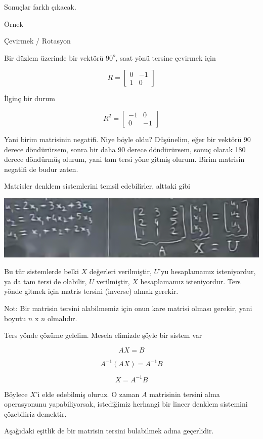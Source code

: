 \documentclass[12pt,fleqn]{article}\usepackage{../../common}
\begin{document}
Sonuçlar farklı çıkacak.

Örnek

Çevirmek / Rotasyon

Bir düzlem üzerinde bir vektörü $90^o$, saat yönü tersine
çevirmek için

$$ R =
\left[\begin{array}{rr}
0 & -1 \\
1 & 0
\end{array}\right]
$$

İlginç bir durum

$$ R^2 =
\left[\begin{array}{rr}
-1 & 0 \\
0 & -1
\end{array}\right]
$$

Yani birim matrisinin negatifi. Niye böyle oldu? Düşünelim, eğer bir vektörü 90
derece döndürürsem, sonra bir daha 90 derece döndürürsem, sonuç olarak 180
derece döndürmüş olurum, yani tam tersi yöne gitmiş olurum. Birim matrisin
negatifi de budur zaten.

Matrisler denklem sistemlerini temsil edebilirler, alttaki gibi

\includegraphics[width=14.9cm]{3_5.png}

Bu tür sistemlerde belki $X$ değerleri verilmiştir, $U$'yu hesaplamamız
isteniyordur, ya da tam tersi de olabilir, $U$ verilmiştir, $X$ hesaplamamız
isteniyordur. Ters yönde gitmek için matris tersini (inverse) almak gerekir.

Not: Bir matrisin tersini alabilmemiz için onun kare matrisi olması gerekir,
yani boyutu $n$ x $n$ olmalıdır.

Ters yönde çözüme gelelim. Mesela elimizde şöyle bir sistem
var

$$  AX = B$$

$$  A^{-1}(AX) = A^{-1}B$$

$$  X = A^{-1}B$$

Böylece $X$'i elde edebilmiş oluruz. O zaman $A$ matrisinin tersini alma
operasyonunu yapabiliyorsak, istediğimiz herhangi bir lineer denklem
sistemini çözebiliriz demektir.

Aşağıdaki eşitlik de bir matrisin tersini bulabilmek adına
geçerlidir.
\end{document}
